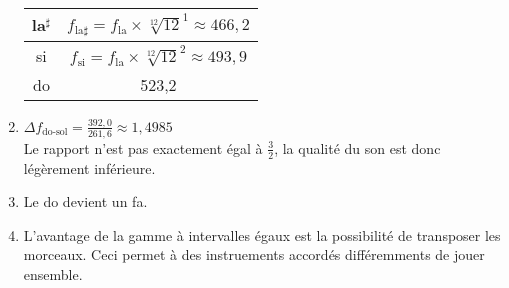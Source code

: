 \documentclass[12pt]{article}
\begin{document}
\begin{enumerate}
\begin{longtable}{ |c|c| }
                    la$^\sharp$   & $f_{\text{la}\sharp}=f_\text{la}\times\sqrt[12]{12}^1\approx 466{,}2$     \\ \hline
                    si            & $f_\text{si}=f_\text{la}\times\sqrt[12]{12}^2\approx 493{,}9$             \\ \hline
                    do            & 523{,}2                                                                   \\ \hline
                \end{longtable}
    \item $\Delta f_\text{do-sol}=\frac{392{,}0}{261{,}6}\approx 1{,}4985$ \\ Le rapport n'est pas exactement égal à $\frac{3}{2}$, la qualité du son est donc légèrement inférieure.
    \item Le do devient un fa.
    \item L'avantage de la gamme à intervalles égaux est la possibilité de transposer les morceaux. Ceci permet à des instruements accordés différemments de jouer ensemble.
    \end{enumerate}
\end{document}

